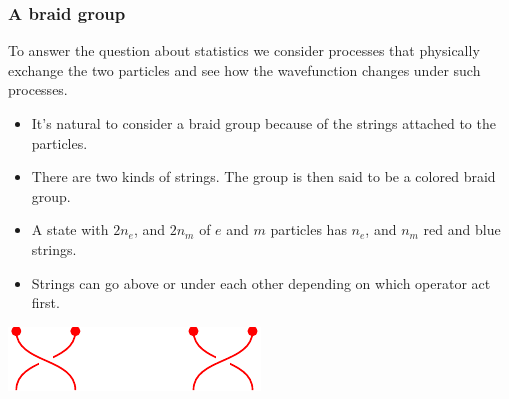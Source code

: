 \documentclass{beamer}
\renewcommand{\(}{\left(}
\renewcommand{\)}{\right)}
\renewcommand{\[}{\left[}
\renewcommand{\]}{\right]}
\begin{document}
\begin{frame}
    \frametitle{A braid group}
    \begin{framed}
        To answer the question about statistics we consider processes that physically exchange the two particles and see how the wavefunction changes under such processes. 
    \end{framed}
    \pause
    \begin{itemize}
        \item It's natural to consider a braid group because of the strings attached to the particles.
        \item There are two kinds of strings. The group is then said to be a colored braid group. 
        \item A state with $2n_e$, and $2n_m$ of $e$ and $m$ particles has $n_e$, and $n_m$ red and blue strings. 
        \item Strings can go above or under each other depending on which operator act first. 
    \end{itemize}
    \centering
    \includegraphics[]{above_under.pdf}
\end{frame}
\end{document}
